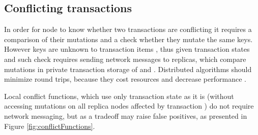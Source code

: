 
\subsection{Conflicting transactions}\label{sec:impl:conflictFunctions}
In order for node  to know whether two transactions are conflicting it requires a comparison of their mutations and a check whether they mutate the same keys. However keys are unknown to transaction items \txItems, thus
given transaction states \txStateOne and \txStateTwo such check requires sending network messages to replicas, which compare mutations in private transaction storage of \txStateOne and \txStateTwo. 
Distributed algorithms should minimize round trips, because they cost resources and decrease performance \cite{rotem2006fallacies}.

Local conflict functions, which use only transaction state \txState as it is (without accessing mutations \mutations on all replica nodes affected by transaction \nodesTx) do not require network messaging, but as a tradeoff may raise false positives, as presented in Figure \ref{fig:conflictFunctions}. 

